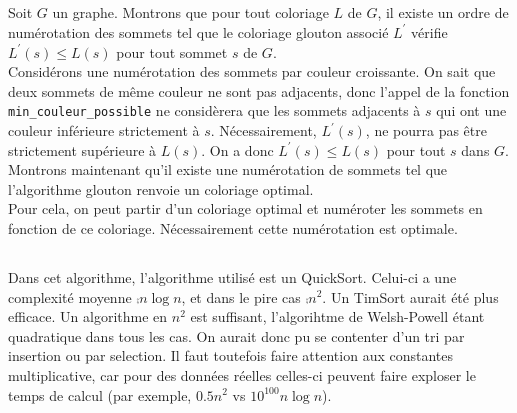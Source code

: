 \subsection{}
Soit $G$ un graphe. Montrons que pour tout coloriage $L$ de $G$, il existe un ordre de numérotation des sommets tel que le coloriage glouton associé $L^\prime$ vérifie $L^\prime(s) \leq L(s)$ pour tout sommet $s$ de $G$.\\
Considérons une numérotation des sommets par couleur croissante. On sait que deux sommets de même couleur ne sont pas adjacents, donc l'appel de la fonction \texttt{min\_couleur\_possible} ne considèrera que les sommets adjacents à $s$ qui ont une couleur inférieure strictement à $s$. Nécessairement, $L^\prime(s)$, ne pourra pas être strictement supérieure à $L(s)$. On a donc $L^\prime(s) \leq L(s)$ pour tout $s$ dans $G$.\\
Montrons maintenant qu'il existe une numérotation de sommets tel que l'algorithme glouton renvoie un coloriage optimal.\\
Pour cela, on peut partir d'un coloriage optimal et numéroter les sommets en fonction de ce coloriage. Nécessairement cette numérotation est optimale.

\subsection{}
Dans cet algorithme, l'algorithme utilisé est un QuickSort. Celui-ci a une complexité moyenne $\comp{n \log n}$, et dans le pire cas $\comp{n^2}$. Un TimSort aurait été plus efficace. Un algorithme en $n^2$ est suffisant, l'algorihtme de Welsh-Powell étant quadratique dans tous les cas. On aurait donc pu se contenter d'un tri par insertion ou par selection. Il faut toutefois faire attention aux constantes multiplicative, car pour des données réelles celles-ci peuvent faire exploser le temps de calcul (par exemple, $0.5n^2$ vs $10^{100}n\log n$).

